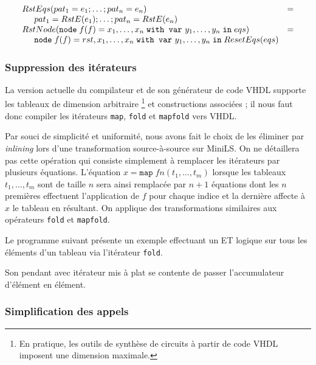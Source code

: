 \documentclass[a4paper]{article}
\newcommand{\mybox}[1]{\mbox{\tt{#1}}}
\newcommand{\ind}[0]{\hspace{0.5cm}}
\newcommand{\Node}[4]{\mybox{node} \; f(#1) = #2 \; \mybox{with var} \
  #3 \; \mybox{in} \; #4}
\newcommand{\Map}[3]{\mathtt{map} \; #1 n (#2,\dots,#3)}
\begin{document}
\[
\begin{array}{ll}
  RstEqs(pat_1 = e_1;\dots;pat_n = e_n) & = \\
  \ind pat_1 = \re{e_1};\dots;pat_n = \re{e_n} \\
  \rstn{\Node{f}{x_1,\dots,x_n}{y_1,\dots,y_n}{eqs}} & = \\
  \ind \Node{f}{rst,x_1,\dots,x_n}{y_1,\dots,y_n}{ResetEqs(eqs)}
\end{array}
\]

\subsubsection{Suppression des it\'erateurs}

La version actuelle du compilateur et de son g\'en\'erateur de code VHDL supporte
les tableaux de dimension arbitraire \footnote{En pratique, les outils de
  synth\`ese de circuits \`a partir de code VHDL imposent une dimension maximale.}
et constructions associ\'ees ; il nous faut donc compiler les it\'erateurs
\texttt{map}, \texttt{fold} et \texttt{mapfold} vers VHDL.

Par souci de simplicit\'e et uniformit\'e, nous avons fait le choix de les \'eliminer
par \textit{inlining} lors d'une transformation source-\`a-source sur MiniLS. On
ne d\'etaillera pas cette op\'eration qui consiste simplement \`a remplacer les
it\'erateurs par plusieurs \'equations. L'\'equation $x = \Map{f}{t_1}{t_m}$ lorsque
les tableaux $t_1, \dots, t_m$ sont de taille $n$ sera ainsi remplac\'ee par $n +
1$ \'equations dont les $n$ premi\`eres effectuent l'application de $f$ pour chaque
indice et la derni\`ere affecte \`a $x$ le tableau en r\'esultant. On applique des
transformations similaires aux op\'erateurs \texttt{fold} et \texttt{mapfold}.

Le programme suivant pr\'esente un exemple effectuant un ET logique sur tous les
\'el\'ements d'un tableau via l'it\'erateur \texttt{fold}.



Son pendant avec it\'erateur mis \`a plat se contente de passer l'accumulateur
d'\'el\'ement en \'el\'ement.



\subsubsection{Simplification des appels}

\newcommand{\simpl}[2]{Simpl(#1,#2)}
\newcommand{\simplnd}[1]{SimplNode(#1)}
\end{document}
